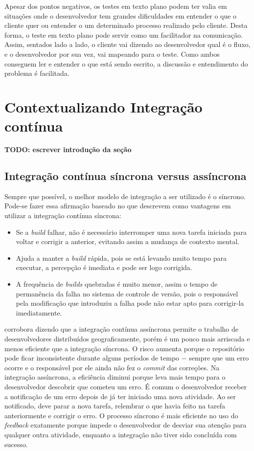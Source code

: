Apesar dos pontos negativos, os testes em texto plano podem ter valia em situações onde o desenvolvedor tem grandes dificuldades em entender o que o cliente quer ou entender o um determinado processo realizado pelo cliente. Desta forma, o teste em texto plano pode servir como um facilitador na comunicação. Assim, sentados lado a lado, o cliente vai dizendo ao desenvolvedor qual é o fluxo, e o desenvolvedor por sua vez, vai mapeando para o teste. Como ambos conseguem ler e entender o que está sendo escrito, a discussão e entendimento do problema é facilitada.


\section{Contextualizando Integração contínua}

\textbf{TODO: escrever introdução da seção}

\subsection{Integração contínua síncrona versus assíncrona}
\label{sub:sincrona_x_assincrona}

Sempre que possível, o melhor modelo de integração a ser utilizado é o síncrono. Pode-se fazer essa afirmação baseado no que  descrevem como vantagens em utilizar a integração contínua síncrona:

\begin{itemize}
  \item Se a \textit{build} falhar, não é necessário interromper uma nova tarefa iniciada para voltar e corrigir a anterior, evitando assim a mudança de contexto mental.
  \item Ajuda a manter a \textit{build} rápida, pois se está levando muito tempo para executar, a percepção é imediata e pode ser logo corrigida.
  \item A frequência de \textit{builds} quebradas é muito menor, assim o tempo de permanência da falha no sistema de controle de versão, pois o responsável pela modificação que introduziu a falha pode não estar apto para corrigir-la imediatamente.
\end{itemize}

 corrobora dizendo que a integração contínua assíncrona permite o trabalho de desenvolvedores distribuídos geograficamente, porém é um pouco mais arriscada e menos eficiente que a integração síncrona. O risco aumenta porque o repositório pode ficar inconsistente durante alguns períodos de tempo $-$ sempre que um erro ocorre e o responsável por ele ainda não fez o \textit{commit} das correções. Na integração assíncrona, a eficiência diminui porque leva mais tempo para o desenvolvedor descobrir que cometeu um erro. É comum o desenvolvedor receber a notificação de um erro depois de já ter iniciado uma nova atividade. Ao ser notificado, deve parar a nova tarefa, relembrar o que havia feito na tarefa anteriormente e corrigir o erro. O processo síncrono é mais eficiente no uso do \textit{feedback} exatamente porque impede o desenvolvedor de desviar sua atenção para qualquer outra atividade, enquanto a integração não tiver sido concluída com sucesso.


